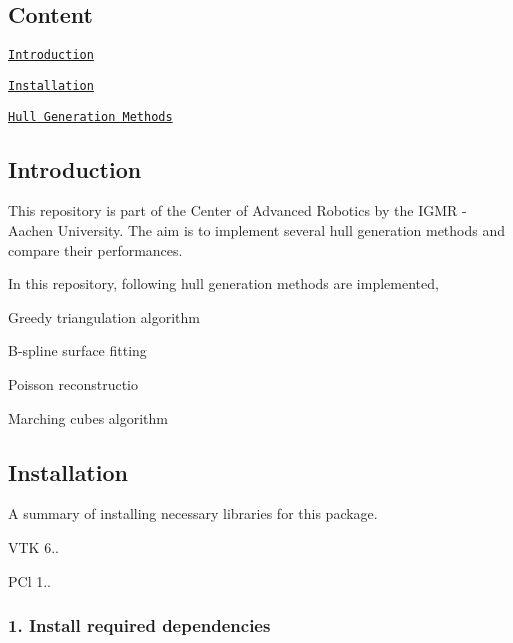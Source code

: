 



\subsection*{Content}


\begin{DoxyItemize}
\item \href{#introduction}{\tt Introduction}
\item \href{#installation}{\tt Installation}
\item \href{#hull-generation-methods}{\tt Hull Generation Methods} 


\end{DoxyItemize}

\subsection*{Introduction}

This repository is part of the Center of Advanced Robotics by the I\+G\+MR -\/ Aachen University. The aim is to implement several hull generation methods and compare their performances.

In this repository, following hull generation methods are implemented,


\begin{DoxyItemize}
\item Greedy triangulation algorithm
\item B-\/spline surface fitting
\item Poisson reconstructio
\item Marching cubes algorithm 


\end{DoxyItemize}

\subsection*{Installation}

A summary of installing necessary libraries for this package.
\begin{DoxyItemize}
\item V\+TK 6..
\item P\+Cl 1.. 


\end{DoxyItemize}

\subsubsection*{1. Install required dependencies}


